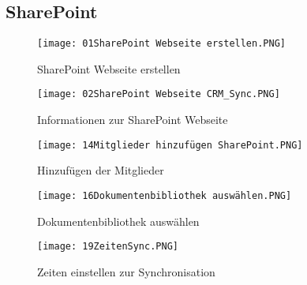 \subsection{SharePoint}
\label{app:SharePoint}

\begin{figure}[htb]
    \centering
    \texttt{[image: 01SharePoint Webseite erstellen.PNG]}
    \caption{SharePoint Webseite erstellen}
    \label{fig:SharePointWebseiteErstellen}
\end{figure}

\begin{figure}[htb]
    \centering
    \texttt{[image: 02SharePoint Webseite CRM\_Sync.PNG]}
    \caption{Informationen zur SharePoint Webseite}
    \label{fig:SharePointWebseiteCRMSync}
\end{figure}

\begin{figure}[htb]
    \centering
    \texttt{[image: 14Mitglieder hinzufügen SharePoint.PNG]}
    \caption{Hinzufügen der Mitglieder}
    \label{fig:MitgliederHinzufuegenSharePoint}
\end{figure}

\begin{figure}[htb]
    \centering
    \texttt{[image: 16Dokumentenbibliothek auswählen.PNG]}
    \caption{Dokumentenbibliothek auswählen}
    \label{fig:DokumentenbibliothekAuswaehlen}
\end{figure}

\begin{figure}[htb]
    \centering
    \texttt{[image: 19ZeitenSync.PNG]}
    \caption{Zeiten einstellen zur Synchronisation}
    \label{fig:ZeitenSync}
\end{figure}
\clearpage
